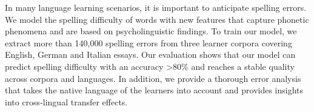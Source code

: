 In many language learning scenarios, it is important to anticipate spelling errors. We model the spelling difficulty of words with new features that capture phonetic phenomena and are based on psycholinguistic findings. To train our model, we extract more than 140,000 spelling errors from three learner corpora covering English, German and Italian essays.  Our evaluation shows that our model can predict spelling difficulty with an accuracy >80\% and reaches a stable quality across corpora and languages. In addition, we provide a thorough error analysis that takes the native language of the learners into account and provides insights into cross-lingual transfer effects.

